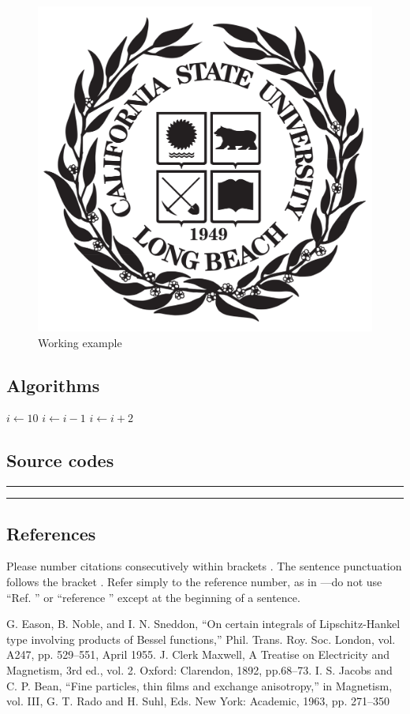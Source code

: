 \documentclass{article}
\begin{document}
\begin{figure}[htbp]
\centering
\includegraphics[width=0.5\columnwidth]{fig1.png}
\caption{Working example}
\label{fig}
\end{figure}

\subsection{Algorithms}
\begin{algorithmic}
    \STATE $i\gets 10$
    \STATE $i\gets i -1$
    \ELSE 
    \STATE $i \gets i + 2$
    \ENDIF
    \ENDIF
\end{algorithmic}

\subsection{Source codes}
\noindent\rule{\textwidth}{0.4pt}
\vspace{-5ex}

\vspace{-3ex}
\noindent\rule{\textwidth}{0.4pt}
\subsection{References}
Please number citations consecutively within brackets
\cite{Eason}. The sentence punctuation follows the bracket
\cite{Maxwell}. Refer simply to the reference number, as in \cite{Jacobs}---do not use ``Ref. \cite{Jacobs}'' or ``reference \cite{Jacobs}'' except at the beginning of a sentence.

\begin{thebibliography}{00}
 G. Eason, B. Noble, and I. N. Sneddon, ``On certain integrals of Lipschitz-Hankel type involving products of Bessel functions,'' Phil. Trans. Roy. Soc. London, vol. A247, pp. 529--551, April 1955.
 J. Clerk Maxwell, A Treatise on Electricity and Magnetism, 3rd ed., vol. 2. Oxford: Clarendon, 1892, pp.68--73.
 I. S. Jacobs and C. P. Bean, ``Fine particles, thin films and exchange anisotropy,'' in Magnetism, vol. III, G. T. Rado and H. Suhl, Eds. New York: Academic, 1963, pp. 271--350
\end{thebibliography}
\end{document}
